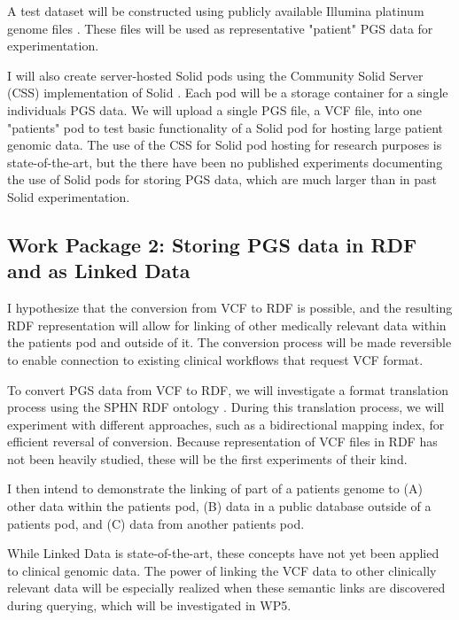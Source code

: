 \documentclass[runningheads]{llncs}
\begin{document}
A test dataset will be constructed using publicly available Illumina platinum genome files \cite{noauthor_platinum_nodate}. 
These files will be used as representative "patient" PGS data for experimentation. 

I will also create server-hosted Solid pods using the Community Solid Server (CSS) implementation of Solid \cite{css}. 
Each pod will be a storage container for a single individual\textquotesingle s PGS data. 
We will upload a single PGS file, a VCF file, into one "patient\textquotesingle s" pod to test basic functionality of a Solid pod for hosting large patient genomic data. 
The use of the CSS for Solid pod hosting for research purposes is state-of-the-art, but the there have been no published experiments documenting the use of Solid pods for storing PGS data, which are much larger than in past Solid experimentation. 


\subsection{Work Package 2:  Storing PGS data in RDF and as Linked Data}

I hypothesize that the conversion from VCF to RDF is possible, and the resulting RDF representation will allow for linking of other medically relevant data within the patient\textquotesingle s pod and outside of it.
The conversion process will be made reversible to enable connection to existing clinical workflows that request VCF format. 

To convert PGS data from VCF to RDF, we will investigate a format translation process using the SPHN RDF ontology \cite{van_der_horst_bridging_2023}. 
During this translation process, we will experiment with different approaches, such as a bidirectional mapping index, for efficient reversal of conversion.
Because representation of VCF files in RDF has not been heavily studied, these will be the first experiments of their kind.

I then intend to demonstrate the linking of part of a patient\textquotesingle s genome to
(A) other data within the patient\textquotesingle s pod, 
(B) data in a public database outside of a patient\textquotesingle s pod, and
(C) data from another patient\textquotesingle s pod.

While Linked Data is state-of-the-art, these concepts have not yet been applied to clinical genomic data.
The power of linking the VCF data to other clinically relevant data will be especially realized when these semantic links are discovered during querying, which will be investigated in WP5. 
\end{document}
